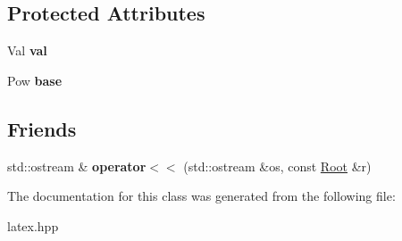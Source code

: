 \subsection*{Protected Attributes}
\begin{DoxyCompactItemize}
\item 
\hypertarget{classlatex_1_1math_1_1Root_ae90dc3215a792f70e39fa7c9b5308197}{Val {\bfseries val}}\label{classlatex_1_1math_1_1Root_ae90dc3215a792f70e39fa7c9b5308197}

\item 
\hypertarget{classlatex_1_1math_1_1Root_aee8892ea5c1f71bf4a7a982d9f0d9ba6}{Pow {\bfseries base}}\label{classlatex_1_1math_1_1Root_aee8892ea5c1f71bf4a7a982d9f0d9ba6}

\end{DoxyCompactItemize}
\subsection*{Friends}
\begin{DoxyCompactItemize}
\item 
\hypertarget{classlatex_1_1math_1_1Root_a74f0bf7df3ef1d4ca32576d6f0a2152b}{std\-::ostream \& {\bfseries operator$<$$<$} (std\-::ostream \&os, const \hyperlink{classlatex_1_1math_1_1Root}{Root} \&r)}\label{classlatex_1_1math_1_1Root_a74f0bf7df3ef1d4ca32576d6f0a2152b}

\end{DoxyCompactItemize}


The documentation for this class was generated from the following file\-:\begin{DoxyCompactItemize}
\item 
latex.\-hpp\end{DoxyCompactItemize}
